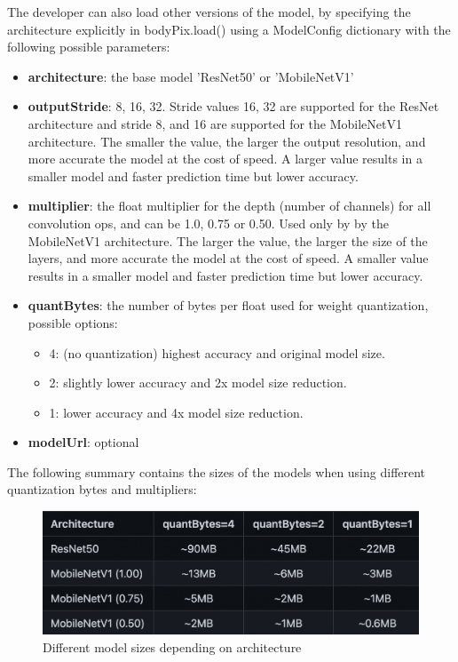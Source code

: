 \documentclass[runningheads,a4paper,11pt]{report}
\begin{document}
The developer can also load other versions of the model, by specifying the architecture explicitly in bodyPix.load() using a ModelConfig dictionary with the following possible parameters:
\begin{itemize}
    \item \textbf{architecture}: the base model 'ResNet50' or 'MobileNetV1'
    \item \textbf{outputStride}: 8, 16, 32. Stride values 16, 32 are supported for the ResNet architecture and stride 8, and 16 are supported for the MobileNetV1 architecture. The smaller the value, the larger the output resolution, and more accurate the model at the cost of speed. A larger value results in a smaller model and faster prediction time but lower accuracy.
    \item \textbf{multiplier}: the float multiplier for the depth (number of channels) for all convolution ops, and can be 1.0, 0.75 or 0.50. Used only by by the MobileNetV1 architecture. The larger the value, the larger the size of the layers, and more accurate the model at the cost of speed. A smaller value results in a smaller model and faster prediction time but lower accuracy.
    \item \textbf{quantBytes}: the number of bytes per float used for weight quantization, possible options:
    \begin{itemize}
        \item 4: (no quantization) highest accuracy and original model size.
        \item 2: slightly lower accuracy and 2x model size reduction.
        \item 1: lower accuracy and 4x model size reduction.
    \end{itemize}
    \item \textbf{modelUrl}: optional
\end{itemize}
The following summary contains the sizes of the models when using different quantization bytes and multipliers:

\begin{figure}
    \centering
\includegraphics[width=13cm]{images/architectureTable.png}
    \caption{Different model sizes depending on architecture}\label{fig:architectureTable}
\end{figure}
\end{document}
